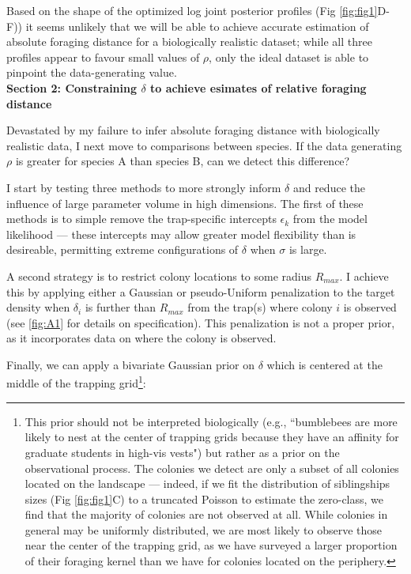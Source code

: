 \documentclass[11pt]{article}
\begin{document}
Based on the shape of the optimized log joint posterior profiles (Fig \ref{fig:fig1}D-F)) it seems unlikely that we will be able to achieve accurate estimation of absolute foraging distance for a biologically realistic dataset; while all three profiles appear to favour small values of $\rho$, only the ideal dataset is able to pinpoint the data-generating value.\\

\noindent \textbf{Section 2: Constraining $\delta$ to achieve esimates of relative foraging distance}

Devastated by my failure to infer absolute foraging distance with biologically realistic data, I next move to comparisons between species. If the data generating $\rho$ is greater for species A than species B, can we detect this difference?

I start by testing three methods to more strongly inform $\delta$ and reduce the influence of large parameter volume in high dimensions. The first of these methods is to simple remove the trap-specific intercepts $\epsilon_k$ from the model likelihood --- these intercepts may allow greater model flexibility than is desireable, permitting extreme configurations of $\delta$ when $\sigma$ is large.

A second strategy is to restrict colony locations to some radius $R_{max}$. I achieve this by applying either a Gaussian or pseudo-Uniform penalization to the target density when $\delta_i$ is further than $R_{max}$ from the trap(s) where colony $i$ is observed (see \ref{fig:A1} for details on specification). This penalization is not a proper prior, as it incorporates data on where the colony is observed. 

Finally, we can apply a bivariate Gaussian prior on $\delta$ which is centered at the middle of the trapping grid\footnote{This prior should not be interpreted biologically (e.g., ``bumblebees are more likely to nest at the center of trapping grids because they have an affinity for graduate students in high-vis vests") but rather as a prior on the observational process. The colonies we detect are only a subset of all colonies located on the landscape --- indeed, if we fit the distribution of siblingships sizes (Fig \ref{fig:fig1}C) to a truncated Poisson to estimate the zero-class, we find that the majority of colonies are not observed at all. While colonies in general may be uniformly distributed, we are most likely to observe those near the center of the trapping grid, as we have surveyed a larger proportion of their foraging kernel than we have for colonies located on the periphery.}:
\end{document}
